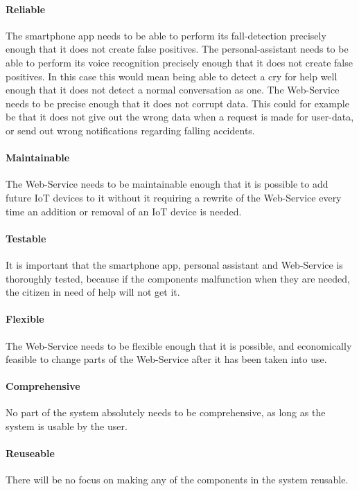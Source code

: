 \paragraph{Reliable}
The smartphone app needs to be able to perform its fall-detection precisely enough that it does not create false positives.
The personal-assistant needs to be able to perform its voice recognition precisely enough that it does not create false positives. In this case this would mean being able to detect a cry for help well enough that it does not detect a normal conversation as one.
The Web-Service needs to be precise enough that it does not corrupt data. This could for example be
that it does not give out the wrong data when a request is made for user-data, or send out wrong notifications regarding falling accidents.

\paragraph{Maintainable}
The Web-Service needs to be maintainable enough that it is possible to add future IoT devices to it without it requiring a rewrite of the Web-Service every time an addition or removal of an IoT device is needed.

\paragraph{Testable}
It is important that the smartphone app, personal assistant and Web-Service is thoroughly tested, because if the components malfunction when they are needed, the citizen in need of help will not get it.

\paragraph{Flexible}
The Web-Service needs to be flexible enough that it is possible, and economically feasible to change parts of the Web-Service after it has been taken into use.

\paragraph{Comprehensive}
No part of the system absolutely needs to be comprehensive, as long as the system is usable by the user.

\paragraph{Reuseable}
There will be no focus on making any of the components in the system reusable.

